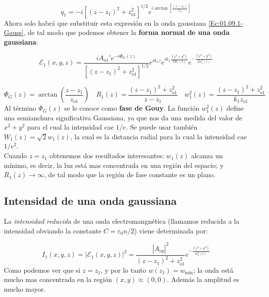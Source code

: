 \documentclass[12pt,a4paper]{book}
\numberwithin{equation}{section}
\numberwithin{figure}{section}
\newcommand{\parentesis}[1]{\left( #1  \right)}
\newcommand{\ccorchetes}[1]{\left[ #1  \right]}
\newcommand{\1}{_{(1)}}
\newcommand{\2}{_{(2)}}
\theoremstyle{definition}
\begin{document}
\begin{equation}
q_1 = -i[(z-z_1)^2 + z_{o1}^2]^{1/2} e^{i \arctan \ccorchetes{ \frac{(z-z_1)}{z_{o1}}}}
\end{equation}
Ahora solo habrá que substituir esta expresión en la onda gaussiana \ref{Ec:01.09.1-Gauss}, de tal modo que podemos obtener la \textbf{forma normal de una onda gaussiana}:

\begin{equation}
\mathcal{E}_1 (x,y,z) = \dfrac{i A_{o1}' e^{-i \Phi_G (z)}}{[(z-z_1)^2 + z_{o1}^2]^{1/2}} e^{i k_1 z} e^{i k_1 \frac{(x^2+y^2)}{2 R_1 (z)}} e^{- \frac{(x^2+y^2)}{2 w_1^2 (z)}} \label{Ec:01.09.1-Gauss}
\end{equation}

\begin{equation}
\Phi_G (z) = \arctan \parentesis{\frac{z-z_1}{z_{o1}}} \quad R_1 (z) = \dfrac{(z-z_1)^2 + z_{o1}^2}{z-z_1} \quad w_1^2 (z) = \dfrac{(z-z_1)^2 + z_{o1}^2}{k_1 z_{o1}}
\end{equation}
Al término $\Phi_G (z)$ se le conoce como \textbf{fase de Gouy}. La función $ w_1^2 (z)$ define una semianchura significativa Gaussiana, ya que nos da una medida del valor de $x^2+y^2$ para el cual la intensidad cae $1/e$. Se puede usar también $W_1 (z) = \sqrt{2} w_1 (z)$, la cual es la distancia radial para la cual la intensidad cae $1/e^2$. \\

Cuando $z=z_1$ obtenemos dos resultados interesantes: $w_1(z)$ alcanza un mínimo, es decir, la luz está mas concentrada en una región del espacio; y $R_1(z) \rightarrow \infty$, de tal modo que la región de fase constante es un plano. 

\subsection{Intensidad de una onda gaussiana}

La \textit{intensidad reducida} de una onda electromangnética (llamamos reducida a la intensidad obviando la constante $C = \varepsilon_0 n / 2$) viene determinada por:

\begin{equation}
I_1 (x,y,z) = |\mathcal{E}_1 (x,y,z)|^2 = \dfrac{|A_{og}|^2}{(z-z_1)^2+z_{o1}^2} e^{-\frac{(x^2+y^2)}{w_1^2 (z)}}
\end{equation}
Como podemos ver que si $z=z_1$, y por lo tanto $w(z_1)=w_{\min}$; la onda está mucho mas concentrada en la región $(x,y)\approx(0,0)$. Además la amplitud es mucho mayor. 
\end{document}
